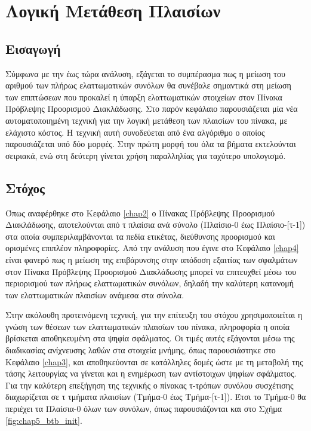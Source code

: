 \chapter{Λογική Μετάθεση Πλαισίων}
\label{chap5}

\section{Εισαγωγή}
\label{chap5_Intro}

Σύμφωνα με την έως τώρα ανάλυση, εξάγεται το συμπέρασμα πως η μείωση του αριθμού των πλήρως ελαττωματικών συνόλων θα συνέβαλε σημαντικά στη μείωση των επιπτώσεων που προκαλεί η ύπαρξη ελαττωματικών στοιχείων στον Πίνακα Πρόβλεψης Προορισμού Διακλάδωσης. Στο παρόν κεφάλαιο παρουσιάζεται μία νέα αυτοματοποιημένη τεχνική για την λογική μετάθεση των πλαισίων του πίνακα, με ελάχιστο κόστος. Η τεχνική αυτή συνοδεύεται από ένα αλγόριθμο ο οποίος παρουσιάζεται υπό δύο μορφές. Στην πρώτη μορφή του όλα τα βήματα εκτελούνται σειριακά, ενώ στη δεύτερη γίνεται χρήση παραλληλίας για ταχύτερο υπολογισμό.


\section{Στόχος}
\label{chap5_Target}

Όπως αναφέρθηκε στο Κεφάλαιο \ref{chap2} ο Πίνακας Πρόβλεψης Προορισμού Διακλάδωσης, αποτελούνται από τ πλαίσια ανά σύνολο (Πλαίσιο-0 έως Πλαίσιο-[τ-1]) στα οποία συμπεριλαμβάνονται τα πεδία ετικέτας, διεύθυνσης προορισμού και ορισμένες επιπλέον πληροφορίες. Από την ανάλυση που έγινε στο Κεφάλαιο \ref{chap4} είναι φανερό πως η μείωση της επιβάρυνσης στην απόδοση εξαιτίας των σφαλμάτων στον Πίνακα Πρόβλεψης Προορισμού Διακλάδωσης μπορεί να επιτευχθεί μέσω του περιορισμού των πλήρως ελαττωματικών συνόλων, δηλαδή την καλύτερη κατανομή των ελαττωματικών πλαισίων ανάμεσα στα σύνολα.
\par
Στην ακόλουθη προτεινόμενη τεχνική, για την επίτευξη του στόχου χρησιμοποιείται η γνώση των θέσεων των ελαττωματικών πλαισίων του πίνακα, πληροφορία η οποία βρίσκεται αποθηκευμένη στα ψηφία σφάλματος. Οι τιμές αυτές εξάγονται μέσω της διαδικασίας ανίχνευσης λαθών στα στοιχεία μνήμης, όπως παρουσιάστηκε στο Κεφάλαιο \ref{chap3}, και αποθηκεύονται σε κατάλληλες δομές ώστε με τη μεταβολή της τάσης λειτουργίας να γίνεται και η ενημέρωση των αντίστοιχων ψηφίων σφάλματος. Για την καλύτερη επεξήγηση της τεχνικής ο πίνακας τ-τρόπων συνόλου συσχέτισης διαχωρίζεται σε τ τμήματα πλαισίων (Τμήμα-0 έως Τμήμα-[τ-1]). Έτσι το Τμήμα-0 θα περιέχει τα Πλαίσια-0 όλων των συνόλων, όπως παρουσιάζονται και στο Σχήμα \ref{fig:chap5_btb_init}.


